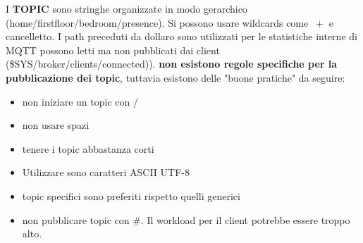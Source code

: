 \documentclass[12pt]{article}
\begin{document}
    			I \textbf{TOPIC} sono stringhe organizzate in modo gerarchico (home/firstfloor/bedroom/presence). Si possono usare wildcards come $\ +$ e cancelletto. I path preceduti da dollaro sono utilizzati per le statistiche interne di MQTT possono letti ma non pubblicati dai client (\$SYS/broker/clients/connected)). \textbf{non esistono regole specifiche per la pubblicazione dei topic}, tuttavia esistono delle "buone pratiche" da seguire:
    			\begin{itemize}
    				\item non iniziare un topic con /
    				\item non usare spazi
    				\item tenere i topic abbastanza corti
    				\item Utilizzare sono caratteri ASCII UTF-8
    				\item topic specifici sono preferiti rispetto quelli generici
    				\item non pubblicare topic con \#. Il workload per il client potrebbe essere troppo alto. 	
    			\end{itemize}
\end{document}
